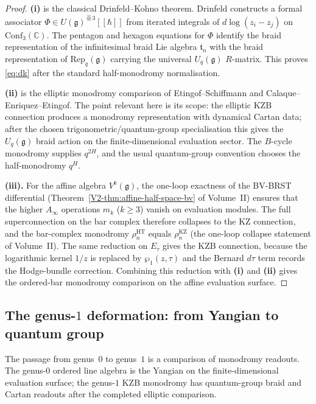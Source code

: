 \begin{proof}
\textbf{(i)} is the classical Drinfeld--Kohno theorem. Drinfeld
constructs a formal associator
$\Phi \in U(\mathfrak{g})^{\widehat\otimes 3}[\![\hbar]\!]$
from iterated integrals of $d\log(z_i-z_j)$ on
$\mathrm{Conf}_3(\mathbb C)$. The pentagon and hexagon equations for
$\Phi$ identify the braid representation of the infinitesimal braid
Lie algebra $\mathfrak t_n$ with the braid representation of
$\mathrm{Rep}_q(\mathfrak g)$ carrying the universal
$U_q(\mathfrak g)$ $R$-matrix. This proves
\eqref{eq:dk} after the standard half-monodromy normalisation.

\medskip
\noindent\textbf{(ii)} is the elliptic monodromy comparison of
Etingof--Schiffmann and Calaque--Enriquez--Etingof. The point relevant
here is its scope: the elliptic KZB connection produces a monodromy
representation with dynamical Cartan data; after the chosen
trigonometric/quantum-group specialisation this gives the
$U_q(\mathfrak g)$ braid action on the finite-dimensional evaluation
sector. The $B$-cycle monodromy supplies $q^{2H}$, and the usual
quantum-group convention chooses the half-monodromy $q^H$.

\medskip
\noindent\textbf{(iii).}
For the affine algebra $V^k(\mathfrak{g})$, the one-loop exactness of
the BV-BRST differential (Theorem~\ref*{V2-thm:affine-half-space-bv} of
Volume~II) ensures that the higher $A_\infty$ operations $m_k$
($k \geq 3$) vanish on evaluation modules. The full superconnection
on the bar complex therefore collapses to the KZ connection, and the
bar-complex monodromy $\rho_n^{\mathrm{HT}}$ equals
$\rho_n^{\mathrm{KZ}}$ (the one-loop collapse statement of
Volume~II). The same reduction on $E_\tau$ gives the KZB connection,
because the logarithmic kernel $1/z$ is replaced by
$\wp_1(z,\tau)$ and the Bernard $d\tau$ term records the
Hodge-bundle correction. Combining this reduction with
\textbf{(i)} and \textbf{(ii)} gives the ordered-bar monodromy
comparison on the affine evaluation surface.
\end{proof}

\subsection{The genus-$1$ deformation: from Yangian to quantum group}
\label{sec:yangian-to-quantum}

The passage from genus~$0$ to genus~$1$ is a comparison of
monodromy readouts. The genus-$0$ ordered line algebra is the
Yangian on the finite-dimensional evaluation surface; the genus-$1$
KZB monodromy has quantum-group braid and Cartan readouts after the
completed elliptic comparison.

